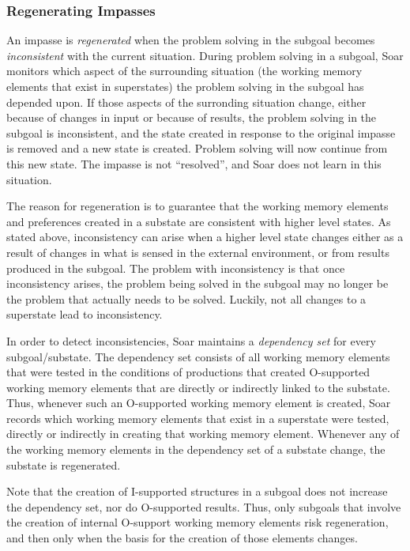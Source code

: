 \subsubsection*{Regenerating Impasses}

An impasse is \textit{regenerated} when the problem solving in the
subgoal becomes {\em inconsistent} with the current situation.  During
problem solving in a subgoal, Soar monitors which aspect of the
surrounding situation (the working memory elements that exist in
superstates) the problem solving in the subgoal has depended upon.  If
those aspects of the surronding situation change, either because of
changes in input or because of results, the problem solving in the
subgoal is inconsistent, and the state created in response to the
original impasse is removed and a new state is created. Problem solving
will now continue from this new state.  The impasse is not ``resolved'',
and Soar does not learn in this situation.

The reason for regeneration is to guarantee that the working memory
elements and preferences created in a substate are consistent with
higher level states.  As stated above, inconsistency can arise when a
higher level state changes either as a result of changes in what is
sensed in the external environment, or from results produced in the
subgoal.  The problem with inconsistency is that once inconsistency
arises, the problem being solved in the subgoal may no longer be the
problem that actually needs to be solved.  Luckily, not all changes to a
superstate lead to inconsistency.

In order to detect inconsistencies, Soar maintains a {\em dependency set}
for every subgoal/substate.  The dependency set consists of all working
memory elements that were tested in the conditions of productions that
created O-supported working memory elements that are directly or
indirectly linked to the substate.  Thus, whenever such an O-supported
working memory element is created, Soar records which working memory
elements that exist in a superstate were tested, directly or indirectly
in creating that working memory element.  Whenever
any of the working memory elements in the dependency set of a substate
change, the substate is regenerated.

Note that the creation of I-supported structures in a subgoal does not
increase the dependency set, nor do O-supported results.  Thus, only
subgoals that involve the creation of internal O-support working memory
elements risk regeneration, and then only when the basis for the
creation of those elements changes.


